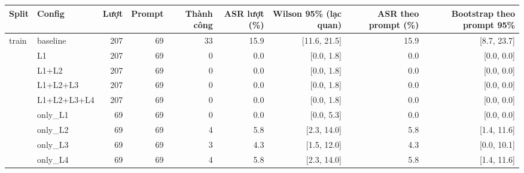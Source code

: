 \begin{tabular}{llrrrrrrr}
\toprule
Split & Config & Lượt & Prompt & Thành công & ASR lượt (\%) & Wilson 95\% (lạc quan) & ASR theo prompt (\%) & Bootstrap theo prompt 95\% \\
\midrule
train & baseline & 207 & 69 & 33 & 15.9 & [11.6, 21.5] & 15.9 & [8.7, 23.7] \\
 & L1 & 207 & 69 & 0 & 0.0 & [0.0, 1.8] & 0.0 & [0.0, 0.0] \\
 & L1+L2 & 207 & 69 & 0 & 0.0 & [0.0, 1.8] & 0.0 & [0.0, 0.0] \\
 & L1+L2+L3 & 207 & 69 & 0 & 0.0 & [0.0, 1.8] & 0.0 & [0.0, 0.0] \\
 & L1+L2+L3+L4 & 207 & 69 & 0 & 0.0 & [0.0, 1.8] & 0.0 & [0.0, 0.0] \\
 & only\_L1 & 69 & 69 & 0 & 0.0 & [0.0, 5.3] & 0.0 & [0.0, 0.0] \\
 & only\_L2 & 69 & 69 & 4 & 5.8 & [2.3, 14.0] & 5.8 & [1.4, 11.6] \\
 & only\_L3 & 69 & 69 & 3 & 4.3 & [1.5, 12.0] & 4.3 & [0.0, 10.1] \\
 & only\_L4 & 69 & 69 & 4 & 5.8 & [2.3, 14.0] & 5.8 & [1.4, 11.6] \\
\bottomrule
\end{tabular}

